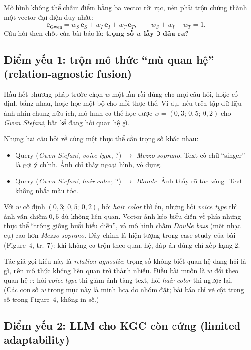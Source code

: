 \documentclass[11pt,a4paper]{article}
\newcommand{\Ent}[1]{\textit{#1}}
\begin{document}
Mô hình không thể chấm điểm bằng ba vector rời rạc, nên phải trộn chúng thành một vector đại diện duy nhất:
\begin{equation*}
\mathbf{e}_{\text{Gwen}} = w_S\,\mathbf{e}_S + w_I\,\mathbf{e}_I + w_T\,\mathbf{e}_T, \qquad w_S + w_I + w_T = 1.
\end{equation*}
Câu hỏi then chốt của bài báo là: \textbf{trọng số $w$ lấy ở đâu ra?}

\subsection{Điểm yếu 1: trộn mô thức ``mù quan hệ'' (relation-agnostic fusion)}

Hầu hết phương pháp trước chọn $w$ một lần rồi dùng cho mọi câu hỏi, hoặc cố định bằng nhau, hoặc học một bộ cho mỗi thực thể. Ví dụ, nếu trên tập dữ liệu ảnh nhìn chung hữu ích, mô hình có thể học được $w = (0{,}3;\ 0{,}5;\ 0{,}2)$ cho \Ent{Gwen Stefani}, bất kể đang hỏi quan hệ gì.

Nhưng hai câu hỏi về cùng một thực thể cần trọng số khác nhau:
\begin{itemize}
\item Query (\Ent{Gwen Stefani}, \Ent{voice type}, ?) $\rightarrow$ \Ent{Mezzo-soprano}. Text có chữ ``singer'' là gợi ý chính. Ảnh chỉ thấy ngoại hình, vô dụng.
\item Query (\Ent{Gwen Stefani}, \Ent{hair color}, ?) $\rightarrow$ \Ent{Blonde}. Ảnh thấy rõ tóc vàng. Text không nhắc màu tóc.
\end{itemize}

Với $w$ cố định $(0{,}3;\ 0{,}5;\ 0{,}2)$, hỏi \Ent{hair color} thì ổn, nhưng hỏi \Ent{voice type} thì ảnh vẫn chiếm $0{,}5$ dù không liên quan. Vector ảnh kéo biểu diễn về phía những thực thể ``trông giống buổi biểu diễn'', và mô hình chấm \Ent{Double bass} (một nhạc cụ) cao hơn \Ent{Mezzo-soprano}. Đây chính là hiện tượng trong case study của bài (Figure~4, tr.~7): khi không có trộn theo quan hệ, đáp án đúng chỉ xếp hạng 2.

Tác giả gọi kiểu này là \textit{relation-agnostic}: trọng số không biết quan hệ đang hỏi là gì, nên mô thức không liên quan trở thành nhiễu. Điều bài muốn là $w$ đổi theo quan hệ $r$: hỏi \Ent{voice type} thì giảm ảnh tăng text, hỏi \Ent{hair color} thì ngược lại. (Các con số $w$ trong mục này là minh hoạ do nhóm đặt; bài báo chỉ vẽ cột trọng số trong Figure~4, không in số.)

\subsection{Điểm yếu 2: LLM cho KGC còn cứng (limited adaptability)}
\end{document}
